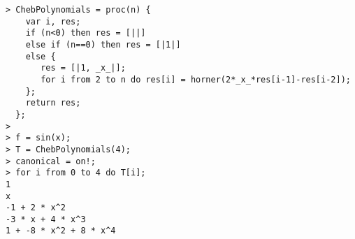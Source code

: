 \begin{center}\begin{minipage}{15cm}\begin{Verbatim}[frame=single]
> ChebPolynomials = proc(n) {
    var i, res;
    if (n<0) then res = [||]
    else if (n==0) then res = [|1|]
    else {
       res = [|1, _x_|];
       for i from 2 to n do res[i] = horner(2*_x_*res[i-1]-res[i-2]);
    };
    return res;
  };
> 
> f = sin(x);
> T = ChebPolynomials(4);
> canonical = on!;
> for i from 0 to 4 do T[i];
1
x
-1 + 2 * x^2
-3 * x + 4 * x^3
1 + -8 * x^2 + 8 * x^4
\end{Verbatim}
\end{minipage}\end{center}
